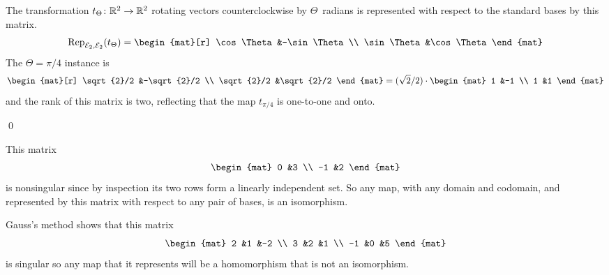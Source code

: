 \documentclass[10pt,t]{beamer}
\begin{document}
\begin{frame}
\ex
The transformation $\mbox{$t_\Theta\colon \mathbb{R}^2\to \mathbb{R}^2$}$ rotating vectors 
counterclockwise by $\Theta$~radians is represented with respect to the
standard bases by this matrix.
\begin{equation*}
  \rep{t_\Theta}{\stdbasis_2,\stdbasis_2}
  =
  \begin{mat}[r]
    \cos\Theta  &-\sin\Theta  \\
    \sin\Theta  &\cos\Theta
  \end{mat}
\end{equation*}
The $\Theta=\pi/4$ instance is
\begin{equation*}
  \begin{mat}[r]
    \sqrt{2}/2  &-\sqrt{2}/2  \\
    \sqrt{2}/2  &\sqrt{2}/2
  \end{mat}
  =(\sqrt{2}/2)\cdot
  \begin{mat}
    1  &-1  \\
    1  &1
  \end{mat}
\end{equation*}
and the rank of this matrix is two, reflecting
that the map $t_{\pi/4}$ is one-to-one and onto. 
\end{frame}




\begin{frame}
\df[df:NonsingularMap]




\pause
\lm[le:NonsingMatIffNonsingMap]
\pause
\pf
{}

\pause
{}
\qed
\end{frame}




\begin{frame}
\ex
This matrix
\begin{equation*}
  \begin{mat}
    0  &3  \\
   -1  &2
  \end{mat}
\end{equation*}
is nonsingular since by inspection its two rows form a linearly independent
set.
So any map, with any domain and codomain, and represented by this matrix  
with respect to any pair of bases,
is an isomorphism.

\pause
\ex
Gauss's method shows that this matrix
\begin{equation*}
  \begin{mat}
    2  &1  &-2  \\
    3  &2  &1   \\
   -1  &0  &5
  \end{mat}
\end{equation*}
is singular so any map that it represents will be a homomorphism that
is not an isomorphism.
\end{frame}




% 
\end{document}
